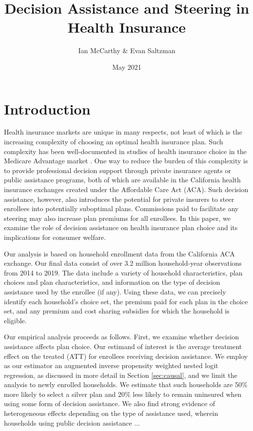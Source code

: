 \documentclass[12pt]{article}
\begin{document}
\title{Decision Assistance and Steering in Health Insurance}
\author{Ian McCarthy \& Evan Saltzman}
\date{May 2021}
\maketitle

\vspace{-2ex}
\begin{abstract}
\noindent 
\end{abstract}

\clearpage

\section{Introduction}
\label{sec:introduction}

Health insurance markets are unique in many respects, not least of which is the increasing complexity of choosing an optimal health insurance plan. Such complexity has been well-documented in studies of health insurance choice in the Medicare Advantage market \citep{abaluck2011, ketcham2012, gruber2017}. One way to reduce the burden of this complexity is to provide professional decision support through private insurance agents or public assistance programs, both of which are available in the California health insurance exchanges created under the Affordable Care Act (ACA). Such decision assistance, however, also introduces the potential for private insurers to steer enrollees into potentially suboptimal plans. Commissions paid to facilitate any steering may also increase plan premiums for all enrollees. In this paper, we examine the role of decision assistance on health insurance plan choice and its implications for consumer welfare.

Our analysis is based on household enrollment data from the California ACA exchange. Our final data consist of over 3.2 million household-year observations from 2014 to 2019. The data include a variety of household characteristics, plan choices and plan characteristics, and information on the type of decision assistance used by the enrollee (if any). Using these data, we can precisely identify each household's choice set, the premium paid for each plan in the choice set, and any premium and cost sharing subsidies for which the household is eligible.

Our empirical analysis proceeds as follows. First, we examine whether decision assistance affects plan choice. Our estimand of interest is the average treatment effect on the treated (ATT) for enrollees receiving decision assistance. We employ as our estimator an augmented inverse propensity weighted nested logit regression, as discussed in more detail in Section \ref{sec:causal}, and we limit the analysis to newly enrolled households. We estimate that such households are 50\% more likely to select a silver plan and 20\% less likely to remain uninsured when using some form of decision assistance. We also find strong evidence of heterogeneous effects depending on the type of assistance used, wherein households using public decision assistance ...
\end{document}
